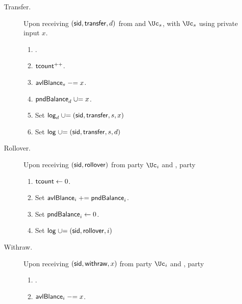 \begin{functionality}
\begin{description}
		
		\item[Transfer.]    Upon receiving  $(\mathsf{sid},\mathsf{transfer},d)$ from  \Cc and  $\Uc_s$, with  $\Uc_s$ using private input $x$. 
		
	
		\begin{enumerate}
			\item {}.
			
				\item $\mathsf{tcount}^{++}$.
				
				
			\item $\mathsf{avlBlance}_s \mathrel{-}= x$.
			
			\item   $\mathsf{pndBalance}_d \mathrel{\cup}= x$.
			
			\item Set $\mathsf{log}_d \mathrel{\cup}= {(\mathsf{sid},\mathsf{transfer},s,x)}$
			
			\item Set $\mathsf{log} \mathrel{\cup}= {(\mathsf{sid},\mathsf{transfer},s,d)}$
			
		\end{enumerate}
		
		\item[Rollover.]     Upon receiving $(\mathsf{sid},\mathsf{rollover})$ from  party $\Uc_i$ and \Cc,  party \Cc
		
		\begin{enumerate}
			
			
			\item $\mathsf{tcount} \leftarrow 0$.
			
			
			\item Set $\mathsf{avlBlance}_i  \mathrel{+}= \mathsf{pndBalance}_i$.
			
			\item Set $\mathsf{pndBalance}_i  \leftarrow 0$.
			
			\item Set $\mathsf{log} \mathrel{\cup}= (\mathsf{sid},\mathsf{rollover},i)$
			
			
		\end{enumerate}

		
			\item[Withraw.]     Upon receiving $(\mathsf{sid},\mathsf{withraw},x)$ from  party $\Uc_i$ and \Cc,  party \Cc
		
		\begin{enumerate}
			
			
			 \item {}.
			
			\item $\mathsf{avlBlance}_i \mathrel{-}= x$.
			

\end{enumerate}
\end{description}
\end{functionality}
